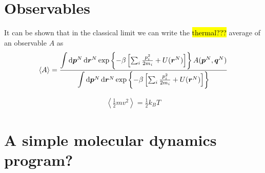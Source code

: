 \chapter{Observables}
It can be shown that in the classical limit we can write the \hl{thermal???} average of an observable $A$ as\cite{frenkel2001understanding}
\begin{align*}
    \left\langle A\right\rangle = \frac
    {
        \biggerint \dif \bvec p^N \dif \rvec^N \exp \left\{ -\beta
            \left[ 
                \sum_i \frac{p_i^2}{2m_i} + U(\rvec^N)
            \right]
        \right\} 
        A(\bvec p^N, \bvec q^N)
    }
    {
        \biggerint \dif \bvec p^N \dif \rvec^N \exp \left\{ -\beta
            \left[ 
                \sum_i \frac{p_i^2}{2m_i} + U(\rvec^N)
            \right]
        \right\}
    }
\end{align*}



\begin{align*}
    \left\langle \frac{1}{2}mv^2 \right\rangle = \frac{1}{2}k_B T
\end{align*}

\chapter{A simple molecular dynamics program?}



